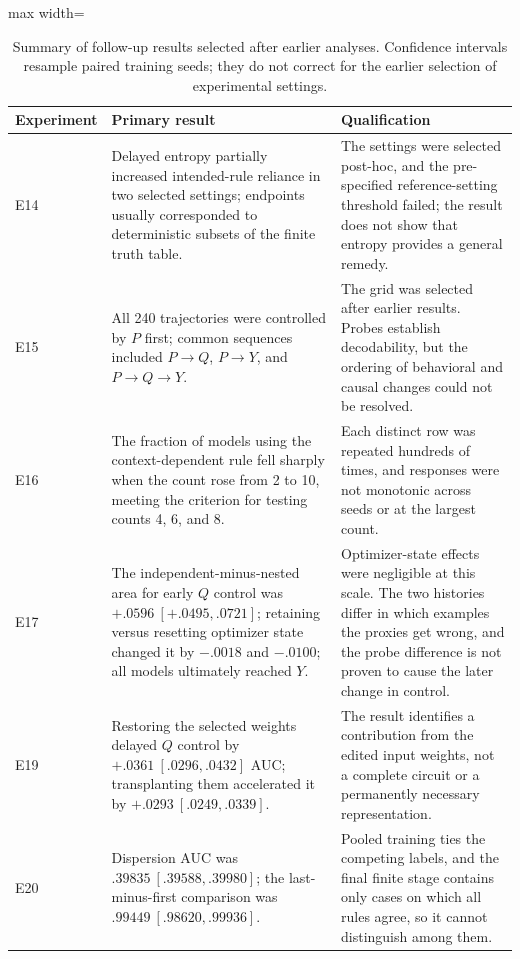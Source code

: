 \begin{table}[!htbp]
\centering
\small
\begin{adjustbox}{max width=\linewidth}
\begin{tabularx}{\linewidth}{l >{\raggedright\arraybackslash}X >{\raggedright\arraybackslash}X}
\toprule
Experiment & Primary result & Qualification \\
\midrule
E14 & Delayed entropy partially increased intended-rule reliance in two selected settings; endpoints usually corresponded to deterministic subsets of the finite truth table. & The settings were selected post-hoc, and the pre-specified reference-setting threshold failed; the result does not show that entropy provides a general remedy. \\
E15 & All 240 trajectories were controlled by $P$ first; common sequences included $P\to Q$, $P\to Y$, and $P\to Q\to Y$. & The grid was selected after earlier results. Probes establish decodability, but the ordering of behavioral and causal changes could not be resolved. \\
E16 & The fraction of models using the context-dependent rule fell sharply when the count rose from 2 to 10, meeting the criterion for testing counts 4, 6, and 8. & Each distinct row was repeated hundreds of times, and responses were not monotonic across seeds or at the largest count. \\
E17 & The independent-minus-nested area for early $Q$ control was $+.0596\ [+.0495,.0721]$; retaining versus resetting optimizer state changed it by $-.0018$ and $-.0100$; all models ultimately reached $Y$. & Optimizer-state effects were negligible at this scale. The two histories differ in which examples the proxies get wrong, and the probe difference is not proven to cause the later change in control. \\
E19 & Restoring the selected weights delayed $Q$ control by $+.0361\ [.0296,.0432]$ AUC; transplanting them accelerated it by $+.0293\ [.0249,.0339]$. & The result identifies a contribution from the edited input weights, not a complete circuit or a permanently necessary representation. \\
E20 & Dispersion AUC was $.39835\ [.39588,.39980]$; the last-minus-first comparison was $.99449\ [.98620,.99936]$. & Pooled training ties the competing labels, and the final finite stage contains only cases on which all rules agree, so it cannot distinguish among them. \\
\bottomrule
\end{tabularx}
\end{adjustbox}
\caption{Summary of follow-up results selected after earlier analyses. Confidence intervals resample paired training seeds; they do not correct for the earlier selection of experimental settings.}
\label{tab:lw-adaptive-ledger}
\end{table}

